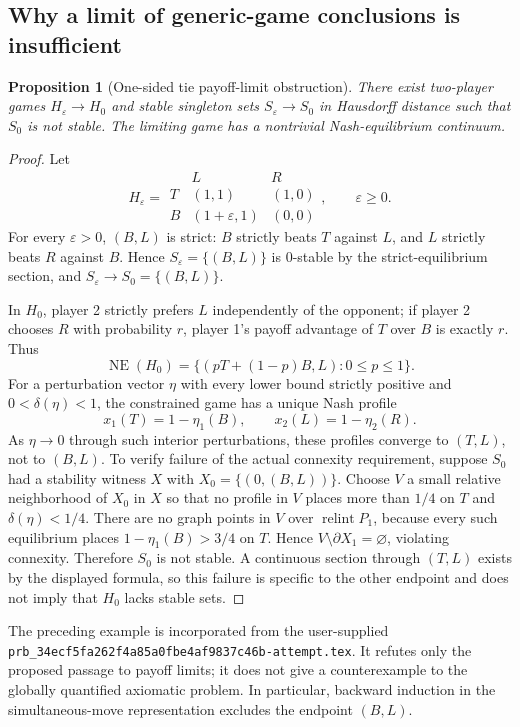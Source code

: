 \documentclass[11pt]{article}
\newtheorem{proposition}[theorem]{Proposition}
\theoremstyle{definition}
\newcommand{\NE}{\operatorname{NE}}
\begin{document}
\subsection{Why a limit of generic-game conclusions is insufficient}\label{sec:payofflimit}
\begin{proposition}[One-sided tie payoff-limit obstruction]\label{prop:limit2}
There exist two-player games $H_\varepsilon\to H_0$ and stable singleton
sets $S_\varepsilon\to S_0$ in Hausdorff distance such that $S_0$ is
not stable. The limiting game has a nontrivial Nash-equilibrium continuum.
\end{proposition}
\begin{proof}
Let
\[
H_\varepsilon=\begin{array}{c|cc}
 &L&R\\\hline
 T&(1,1)&(1,0)\\
 B&(1+\varepsilon,1)&(0,0)
\end{array},\qquad \varepsilon\ge0.
\]
For every $\varepsilon>0$, $(B,L)$ is strict: $B$ strictly beats $T$
against $L$, and $L$ strictly beats $R$ against $B$. Hence
$S_\varepsilon=\{(B,L)\}$ is $0$-stable by the strict-equilibrium
section, and $S_\varepsilon\to S_0=\{(B,L)\}$.

In $H_0$, player 2 strictly prefers $L$ independently of the opponent;
if player 2 chooses $R$ with probability $r$, player 1's payoff
advantage of $T$ over $B$ is exactly $r$. Thus
\[
 \NE(H_0)=\{(pT+(1-p)B,L):0\le p\le1\}.
\]
For a perturbation vector $\eta$ with every lower bound strictly
positive and $0<\delta(\eta)<1$, the constrained game has a unique
Nash profile
\[
 x_1(T)=1-\eta_1(B),\qquad x_2(L)=1-\eta_2(R).
\]
As $\eta\to0$ through such interior perturbations, these profiles
converge to $(T,L)$, not to $(B,L)$. To verify failure of the actual
connexity requirement, suppose $S_0$ had a stability witness $X$ with
$X_0=\{(0,(B,L))\}$. Choose $V$ a small relative neighborhood of
$X_0$ in $X$ so that no profile in $V$ places more than $1/4$ on $T$
and $\delta(\eta)<1/4$. There are no graph points in $V$ over
$\operatorname{relint}P_1$, because every such equilibrium places
$1-\eta_1(B)>3/4$ on $T$. Hence
$V\setminus\partial X_1=\varnothing$, violating connexity.
Therefore $S_0$ is not stable. A continuous section through $(T,L)$
exists by the displayed formula, so this failure is specific to the
other endpoint and does not imply that $H_0$ lacks stable sets.
\end{proof}

The preceding example is incorporated from the user-supplied
\texttt{prb\_34ecf5fa262f4a85a0fbe4af9837c46b-attempt.tex}. It refutes only the proposed passage to
payoff limits; it does not give a counterexample to the globally
quantified axiomatic problem. In particular, backward induction in the
simultaneous-move representation excludes the endpoint $(B,L)$.
\end{document}
